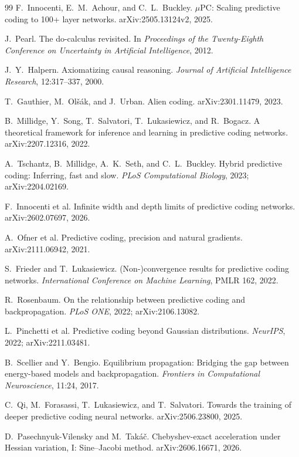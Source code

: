 \documentclass[11pt]{article}
\begin{document}
\begin{thebibliography}{99}
 F.~Innocenti, E.~M.~Achour, and C.~L.~Buckley.
$\mu$PC: Scaling predictive coding to 100+ layer networks.
arXiv:2505.13124v2, 2025.

 J.~Pearl.
The do-calculus revisited.
In \emph{Proceedings of the Twenty-Eighth Conference on Uncertainty in Artificial
Intelligence}, 2012.

 J.~Y.~Halpern.
Axiomatizing causal reasoning.
\emph{Journal of Artificial Intelligence Research}, 12:317--337, 2000.

 T.~Gauthier, M.~Ol\v{s}\'ak, and J.~Urban.
Alien coding. arXiv:2301.11479, 2023.

 B.~Millidge, Y.~Song, T.~Salvatori, T.~Lukasiewicz, and R.~Bogacz.
A theoretical framework for inference and learning in predictive coding networks.
arXiv:2207.12316, 2022.

 A.~Tschantz, B.~Millidge, A.~K.~Seth, and C.~L.~Buckley.
Hybrid predictive coding: Inferring, fast and slow.
\emph{PLoS Computational Biology}, 2023; arXiv:2204.02169.

 F.~Innocenti et al.
Infinite width and depth limits of predictive coding networks. arXiv:2602.07697, 2026.

 A.~Ofner et al.
Predictive coding, precision and natural gradients. arXiv:2111.06942, 2021.

 S.~Frieder and T.~Lukasiewicz.
(Non-)convergence results for predictive coding networks.
\emph{International Conference on Machine Learning}, PMLR 162, 2022.

 R.~Rosenbaum.
On the relationship between predictive coding and backpropagation.
\emph{PLoS ONE}, 2022; arXiv:2106.13082.

 L.~Pinchetti et al.
Predictive coding beyond Gaussian distributions. \emph{NeurIPS}, 2022; arXiv:2211.03481.

 B.~Scellier and Y.~Bengio.
Equilibrium propagation: Bridging the gap between energy-based models and
backpropagation. \emph{Frontiers in Computational Neuroscience}, 11:24, 2017.

 C.~Qi, M.~Forasassi, T.~Lukasiewicz, and T.~Salvatori.
Towards the training of deeper predictive coding neural networks. arXiv:2506.23800, 2025.

 D.~Pasechnyuk-Vilensky and M.~Tak\'a\v{c}.
Chebyshev-exact acceleration under Hessian variation, I: Sine--Jacobi method.
arXiv:2606.16671, 2026.

\end{thebibliography}
\end{document}
